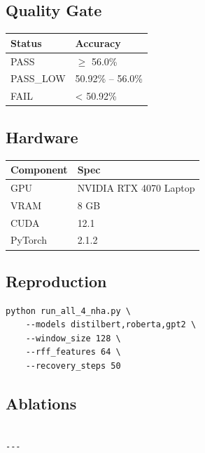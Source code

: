 \subsection{Quality Gate}

\begin{table}[H]
\centering
\small
\begin{tabular}{ll}
\toprule
\textbf{Status} & \textbf{Accuracy} \\
\midrule
PASS & $\ge$ 56.0\% \\
PASS\_LOW & 50.92\% -- 56.0\% \\
FAIL & < 50.92\% \\
\bottomrule
\end{tabular}
\end{table}

\subsection{Hardware}

\begin{table}[H]
\centering
\small
\begin{tabular}{ll}
\toprule
\textbf{Component} & \textbf{Spec} \\
\midrule
GPU & NVIDIA RTX 4070 Laptop \\
VRAM & 8 GB \\
CUDA & 12.1 \\
PyTorch & 2.1.2 \\
\bottomrule
\end{tabular}
\end{table}

\subsection{Reproduction}

\begin{lstlisting}
python run_all_4_nha.py \
    --models distilbert,roberta,gpt2 \
    --window_size 128 \
    --rff_features 64 \
    --recovery_steps 50
\end{lstlisting}

\subsection{Ablations}

\begin{lstlisting}

---
\end{lstlisting}